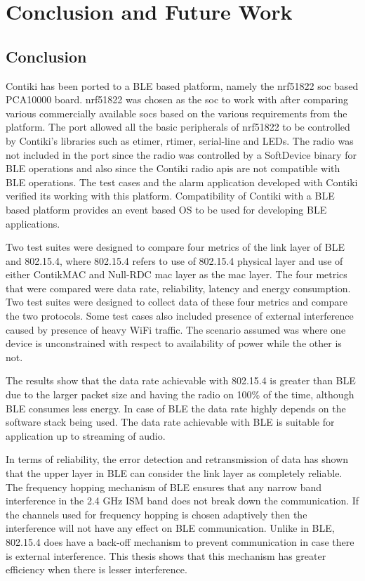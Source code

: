 \chapter{Conclusion and Future Work} \label{9ConcFuture}
\section{Conclusion}

Contiki has been ported to a BLE based platform, namely the nrf51822 \gls{soc} based PCA10000 board. nrf51822 was chosen as the \gls{soc} to work with after comparing various commercially available \glspl{soc} based on the various requirements from the platform. The port allowed all the basic peripherals of nrf51822 to be controlled by Contiki's libraries such as etimer, rtimer, serial-line and LEDs.  The radio was not included in the port since the radio was controlled by a SoftDevice binary for BLE operations and also since the Contiki radio \glspl{api} are not compatible with BLE operations. The test cases and the alarm application developed with Contiki verified its working with this platform. Compatibility of Contiki with a BLE based platform provides an event based OS to be used for developing BLE applications.

Two test suites were designed to compare four metrics of the link layer of BLE and 802.15.4, where 802.15.4 refers to use of 802.15.4 physical layer and use of either ContikMAC and Null-RDC \gls{mac} layer as the \gls{mac} layer. The four metrics that were compared were data rate, reliability, latency and energy consumption. Two test suites were designed to collect data of these four metrics and compare the two protocols. Some test cases also included presence of external interference caused by presence of heavy WiFi traffic. The scenario assumed was where one device is unconstrained with respect to availability of power while the other is not.

The results show that the data rate achievable with 802.15.4 is greater than BLE due to the larger packet size and having the radio on 100\% of the time, although BLE consumes less energy. In case of BLE the data rate highly depends on the software stack being used. The data rate achievable with BLE is suitable for application up to streaming of audio.  

In terms of reliability, the error detection and retransmission of data has shown that the upper layer in BLE can consider the link layer as completely reliable. The frequency hopping mechanism of BLE ensures that any narrow band interference in the 2.4 GHz ISM band does not break down the communication. If the channels used for frequency hopping is chosen adaptively then the interference will not have any effect on BLE communication. Unlike in BLE, 802.15.4 does have a back-off mechanism to prevent communication in case there is external interference. This thesis shows that this mechanism has greater efficiency when there is lesser interference. 

